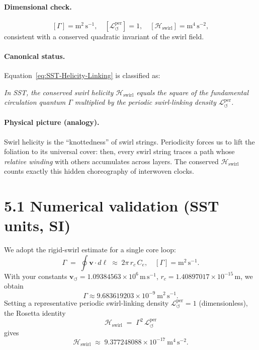 \documentclass[11pt]{article}
\begin{document}
\paragraph{Dimensional check.}
    \[
        [\Gamma] = \mathrm{m}^2 \,\mathrm{s}^{-1},
        \quad [\mathcal{L}_{\circlearrowleft}^{\mathrm{per}}]=1,
        \quad [\mathcal{H}_{\text{swirl}}] = \mathrm{m}^4 \,\mathrm{s}^{-2},
    \]
    consistent with a conserved quadratic invariant of the swirl field.

\paragraph{Canonical status.}
    Equation~\eqref{eq:SST-Helicity-Linking} is classified as:
    \begin{center}
    \end{center}
    \emph{In SST, the conserved swirl helicity $\mathcal{H}_{\text{swirl}}$ equals the square of the fundamental circulation quantum $\Gamma$ multiplied by the periodic swirl-linking density $\mathcal{L}_{\circlearrowleft}^{\mathrm{per}}$.}

\paragraph{Physical picture (analogy).}
    Swirl helicity is the ``knottedness'' of swirl strings. Periodicity forces us to lift the foliation to its universal cover: then, every swirl string traces a path whose \emph{relative winding} with others accumulates across layers. The conserved $\mathcal{H}_{\text{swirl}}$ counts exactly this hidden choreography of interwoven clocks.

\section*{5.1 Numerical validation (SST units, SI)}
We adopt the rigid-swirl estimate for a single core loop:
\[
    \Gamma \;=\; \oint \mathbf{v}\cdot d\boldsymbol{\ell}
    \;\approx\; 2\pi\, r_c\, C_e,
    \quad
    [\Gamma]=\mathrm{m^2\,s^{-1}}.
\]
With your constants
\( \mathbf{v}_{\scriptscriptstyle\boldsymbol{\circlearrowleft}} = 1.09384563\times 10^{6}\,\mathrm{m\,s^{-1}}\),
\( r_c = 1.40897017\times 10^{-15}\,\mathrm{m}\),
we obtain
\[
    \Gamma \approx 9.683619203\times 10^{-9}\ \mathrm{m^2\,s^{-1}}.
\]
Setting a representative periodic swirl-linking density
\( \mathcal{L}_{\circlearrowleft}^{\mathrm{per}} = 1 \) (dimensionless),
the Rosetta identity
\[
    \mathcal{H}_{\text{swirl}} \;=\; \Gamma^2\, \mathcal{L}_{\circlearrowleft}^{\mathrm{per}}
\]
gives
\[
    \mathcal{H}_{\text{swirl}}
    \;\approx\; 9.377248088\times 10^{-17}\ \mathrm{m^4\,s^{-2}}.
\]
\end{document}
